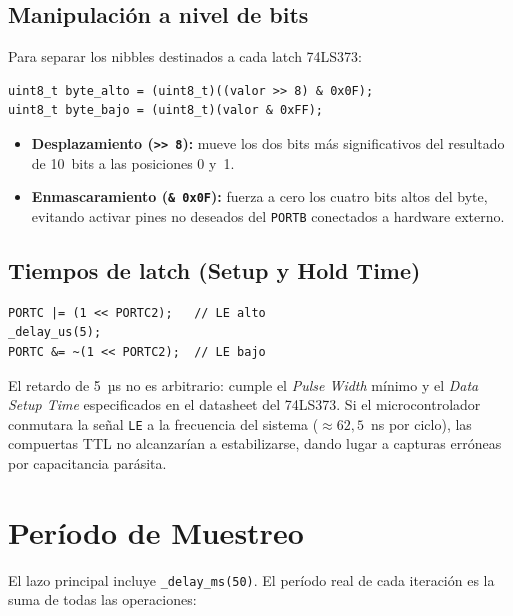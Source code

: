 \documentclass[12pt, a4paper]{article}
\begin{document}
\subsection{Manipulación a nivel de bits}

Para separar los nibbles destinados a cada latch 74LS373:

\begin{lstlisting}[style=avr]
uint8_t byte_alto = (uint8_t)((valor >> 8) & 0x0F);
uint8_t byte_bajo = (uint8_t)(valor & 0xFF);
\end{lstlisting}

\begin{itemize}
    \item \textbf{Desplazamiento (\texttt{>> 8}):} mueve los dos bits más
          significativos del resultado de 10~bits a las posiciones 0 y~1.
    \item \textbf{Enmascaramiento (\texttt{\& 0x0F}):} fuerza a cero los cuatro
          bits altos del byte, evitando activar pines no deseados del
          \texttt{PORTB} conectados a hardware externo.
\end{itemize}

\subsection{Tiempos de latch (Setup y Hold Time)}

\begin{lstlisting}[style=avr]
PORTC |= (1 << PORTC2);   // LE alto
_delay_us(5);
PORTC &= ~(1 << PORTC2);  // LE bajo
\end{lstlisting}

El retardo de 5~µs no es arbitrario: cumple el \emph{Pulse Width} mínimo y el
\emph{Data Setup Time} especificados en el datasheet del 74LS373. Si el
microcontrolador conmutara la señal \texttt{LE} a la frecuencia del sistema
($\approx 62{,}5$~ns por ciclo), las compuertas TTL no alcanzarían a
estabilizarse, dando lugar a capturas erróneas por capacitancia parásita.

\section{Período de Muestreo}

El lazo principal incluye \texttt{\_delay\_ms(50)}. El período real de cada
iteración es la suma de todas las operaciones:
\end{document}
